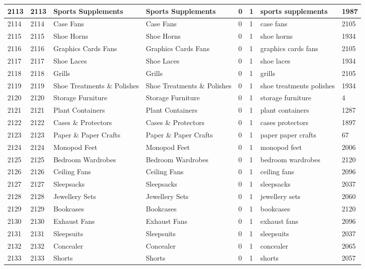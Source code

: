 \begin{longtable}{|l|l|l|l|l|l|l|l|}
2113 & 2113 & Sports Supplements & Sports Supplements & 0 & 1 & sports supplements & 1987 \\ \hline 
2114 & 2114 & Case Fans & Case Fans & 0 & 1 & case fans & 2105 \\ \hline 
2115 & 2115 & Shoe Horns & Shoe Horns & 0 & 1 & shoe horns & 1934 \\ \hline 
2116 & 2116 & Graphics Cards Fans & Graphics Cards Fans & 0 & 1 & graphics cards fans & 2105 \\ \hline 
2117 & 2117 & Shoe Laces & Shoe Laces & 0 & 1 & shoe laces & 1934 \\ \hline 
2118 & 2118 & Grills & Grills & 0 & 1 & grills & 2105 \\ \hline 
2119 & 2119 & Shoe Treatments \& Polishes & Shoe Treatments \& Polishes & 0 & 1 & shoe treatments polishes & 1934 \\ \hline 
2120 & 2120 & Storage Furniture & Storage Furniture & 0 & 1 & storage furniture & 4 \\ \hline 
2121 & 2121 & Plant Containers & Plant Containers & 0 & 1 & plant containers & 1287 \\ \hline 
2122 & 2122 & Cases \& Protectors & Cases \& Protectors & 0 & 1 & cases protectors & 1897 \\ \hline 
2123 & 2123 & Paper \& Paper Crafts & Paper \& Paper Crafts & 0 & 1 & paper paper crafts & 67 \\ \hline 
2124 & 2124 & Monopod Feet & Monopod Feet & 0 & 1 & monopod feet & 2006 \\ \hline 
2125 & 2125 & Bedroom Wardrobes & Bedroom Wardrobes & 0 & 1 & bedroom wardrobes & 2120 \\ \hline 
2126 & 2126 & Ceiling Fans & Ceiling Fans & 0 & 1 & ceiling fans & 2096 \\ \hline 
2127 & 2127 & Sleepsacks & Sleepsacks & 0 & 1 & sleepsacks & 2037 \\ \hline 
2128 & 2128 & Jewellery Sets & Jewellery Sets & 0 & 1 & jewellery sets & 2060 \\ \hline 
2129 & 2129 & Bookcases & Bookcases & 0 & 1 & bookcases & 2120 \\ \hline 
2130 & 2130 & Exhaust Fans & Exhaust Fans & 0 & 1 & exhaust fans & 2096 \\ \hline 
2131 & 2131 & Sleepsuits & Sleepsuits & 0 & 1 & sleepsuits & 2037 \\ \hline 
2132 & 2132 & Concealer & Concealer & 0 & 1 & concealer & 2065 \\ \hline 
2133 & 2133 & Shorts & Shorts & 0 & 1 & shorts & 2057 \\ \hline 

\end{longtable}
